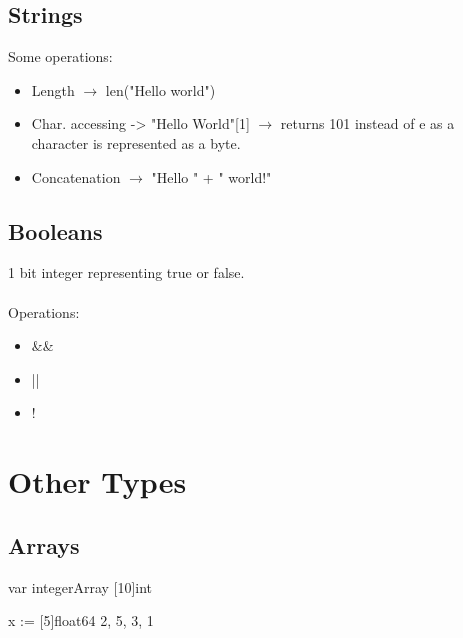 \documentclass[twoside,a4paper,english]{report}
\begin{document}
\section{Strings}
Some operations:
\begin{itemize}
\item Length $\rightarrow$ len("Hello world")
\item Char. accessing -> "Hello World"[1] $\rightarrow$ returns 101 instead of e as a character is represented as a byte.  
\item Concatenation $\rightarrow$ "Hello " + " world!"	
\end{itemize}
\section{Booleans}
1 bit integer representing true or false.\\\\
Operations:
\begin{itemize}
\item \&\&
\item ||
\item !
\end{itemize}
\chapter{Other Types}
\section{Arrays}
\begin{go}
var integerArray [10]int

x := [5]float64{ 2, 5, 3, 1}
\end{go}
\end{document}
